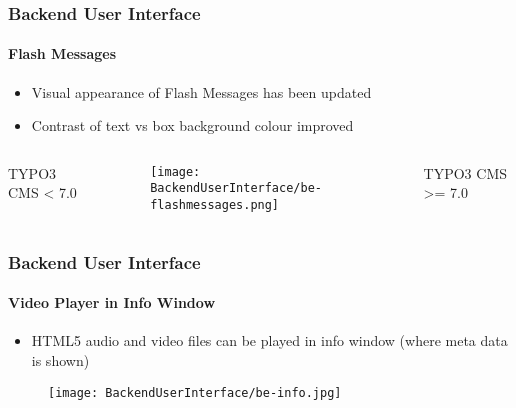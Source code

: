 \begin{frame}[fragile]
	\frametitle{Backend User Interface}
	\framesubtitle{Flash Messages}

	\begin{itemize}
		\item Visual appearance of Flash Messages has been updated
		\item Contrast of text vs box background colour improved
	\end{itemize}

	\begin{columns}[T]
		\begin{column}{.25\textwidth}
			\smaller\hfill
				\begingroup\color{typo3red}TYPO3 CMS < 7.0\endgroup
			\normalsize
		\end{column}

		\begin{column}{.5\textwidth}
			\begin{figure}\vspace*{-0.6cm}
				\texttt{[image: BackendUserInterface/be-flashmessages.png]}
			\end{figure}
		\end{column}

		\begin{column}{.25\textwidth}
			\smaller
				\begingroup\color{typo3red}TYPO3 CMS >= 7.0\endgroup
			\normalsize
		\end{column}
	\end{columns}

\end{frame}


\begin{frame}[fragile]
	\frametitle{Backend User Interface}
	\framesubtitle{Video Player in Info Window}

	\begin{itemize}
		\item HTML5 audio and video files can be played in info window\newline
			(where meta data is shown)
	\end{itemize}

	\begin{figure}
		\texttt{[image: BackendUserInterface/be-info.jpg]}
	\end{figure}

\end{frame}

